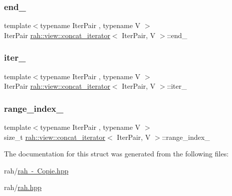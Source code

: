 \subsubsection{\texorpdfstring{end\_}{end\_}}
{\footnotesize\ttfamily template$<$typename Iter\+Pair , typename V $>$ \\
Iter\+Pair \mbox{\hyperlink{structrah_1_1view_1_1concat__iterator}{rah\+::view\+::concat\+\_\+iterator}}$<$ Iter\+Pair, V $>$\+::end\+\_\+}

\mbox{\label{structrah_1_1view_1_1concat__iterator_affb17b45b66a04b01962c8b84dc20c43}} 
\subsubsection{\texorpdfstring{iter\_}{iter\_}}
{\footnotesize\ttfamily template$<$typename Iter\+Pair , typename V $>$ \\
Iter\+Pair \mbox{\hyperlink{structrah_1_1view_1_1concat__iterator}{rah\+::view\+::concat\+\_\+iterator}}$<$ Iter\+Pair, V $>$\+::iter\+\_\+}

\mbox{\label{structrah_1_1view_1_1concat__iterator_af57a6e3b1baf3641831378c7919e4256}} 
\subsubsection{\texorpdfstring{range\_index\_}{range\_index\_}}
{\footnotesize\ttfamily template$<$typename Iter\+Pair , typename V $>$ \\
size\+\_\+t \mbox{\hyperlink{structrah_1_1view_1_1concat__iterator}{rah\+::view\+::concat\+\_\+iterator}}$<$ Iter\+Pair, V $>$\+::range\+\_\+index\+\_\+}



The documentation for this struct was generated from the following files\+:\begin{DoxyCompactItemize}
\item 
rah/\mbox{\hyperlink{rah_01-_01_copie_8hpp}{rah -\/ Copie.\+hpp}}\item 
rah/\mbox{\hyperlink{rah_8hpp}{rah.\+hpp}}\end{DoxyCompactItemize}
